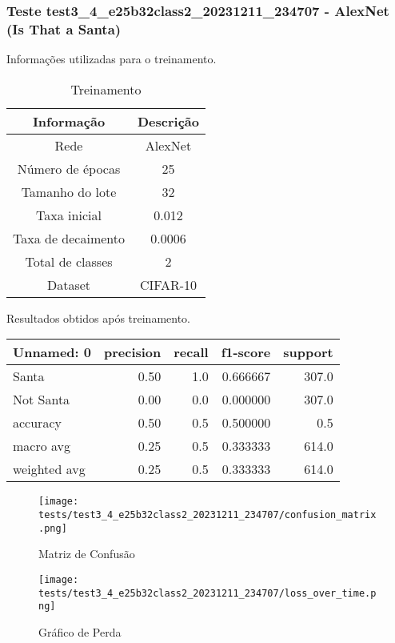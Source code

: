 \subsubsection{Teste test3_4_e25b32class2_20231211_234707 - AlexNet (Is That a Santa)}

Informações utilizadas para o treinamento.

\begin{table}[ht]
   \centering
   \caption{Treinamento}
   \label{tab:modelos}
   \begin{tabular}{| c | c | }
      \hline 
      \textbf{Informação} & \textbf{Descrição} \\
      \hline \hline 
      Rede & AlexNet \\
      \hline
      Número de épocas & 25\\
      \hline
      Tamanho do lote & 32\\
      \hline
      Taxa inicial & 0.012 \\
      \hline
      Taxa de decaimento & 0.0006 \\
      \hline
      Total de classes & 2\\
      \hline
      Dataset & CIFAR-10\\
      \hline
   \end{tabular} 
\end{table}

Resultados obtidos após treinamento.

\begin{tabular}{lrrrr}
\toprule
  Unnamed: 0 &  precision &  recall &  f1-score &  support \\
\midrule
       Santa &       0.50 &     1.0 &  0.666667 &    307.0 \\
   Not Santa &       0.00 &     0.0 &  0.000000 &    307.0 \\
    accuracy &       0.50 &     0.5 &  0.500000 &      0.5 \\
   macro avg &       0.25 &     0.5 &  0.333333 &    614.0 \\
weighted avg &       0.25 &     0.5 &  0.333333 &    614.0 \\
\bottomrule
\end{tabular}


\begin{figure}[ht]
 \begin{center}
   \texttt{[image: tests/test3\_4\_e25b32class2\_20231211\_234707/confusion\_matrix.png]}
  \caption{Matriz de Confusão}
  \label{fig:fig03}
 \end{center}
\end{figure}

\begin{figure}[ht]
 \begin{center}
   \texttt{[image: tests/test3\_4\_e25b32class2\_20231211\_234707/loss\_over\_time.png]}
  \caption{Gráfico de Perda}
  \label{fig:fig04}
 \end{center}
\end{figure}

